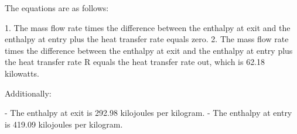 The equations are as follows:

1. The mass flow rate times the difference between the enthalpy at exit and the enthalpy at entry plus the heat transfer rate equals zero.
2. The mass flow rate times the difference between the enthalpy at exit and the enthalpy at entry plus the heat transfer rate R equals the heat transfer rate out, which is 62.18 kilowatts.

Additionally:

- The enthalpy at exit is 292.98 kilojoules per kilogram.
- The enthalpy at entry is 419.09 kilojoules per kilogram.